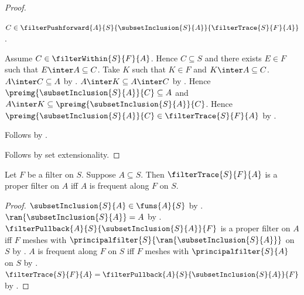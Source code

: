 \begin{proof}
\begin{subproof}
            $C\in\filterPushforward{A}{S}{\subsetInclusion{S}{A}}{
                \filterTrace{S}{F}{A}}$.
        \begin{subproof}
            Assume $C\in\filterWithin{S}{F}{A}$.
            Hence $C\subseteq S$ and there exists $E\in F$ such that
                $E\inter A\subseteq C$.
            Take $K$ such that $K\in F$ and $K\inter A\subseteq C$.
            $A\inter C\subseteq A$ by .
            $A\inter K\subseteq A\inter C$ by
                .
            Hence $\preimg{\subsetInclusion{S}{A}}{C}\subseteq A$ and
                $A\inter K\subseteq
                    \preimg{\subsetInclusion{S}{A}}{C}$.
            Hence $\preimg{\subsetInclusion{S}{A}}{C}
                \in\filterTrace{S}{F}{A}$ by \auto.
        \end{subproof}
        Follows by \auto.
    \end{subproof}
    Follows by set extensionality.
\end{proof}

\begin{theorem}\label{filter_trace_is_proper_iff_frequent}
    Let $F$ be a filter on $S$.
    Suppose $A\subseteq S$.
    Then $\filterTrace{S}{F}{A}$ is a proper filter on $A$ iff
        $A$ is frequent along $F$ on $S$.
\end{theorem}
\begin{proof}
    $\subsetInclusion{S}{A}\in\funs{A}{S}$ by
        .
    $\ran{\subsetInclusion{S}{A}}=A$ by
        .
    $\filterPullback{A}{S}{\subsetInclusion{S}{A}}{F}$ is a proper filter
        on $A$ iff
        $F$ meshes with
            $\principalfilter{S}{\ran{\subsetInclusion{S}{A}}}$ on $S$ by
        .
    $A$ is frequent along $F$ on $S$ iff
        $F$ meshes with $\principalfilter{S}{A}$ on $S$ by
        .
    $\filterTrace{S}{F}{A}
        =\filterPullback{A}{S}{\subsetInclusion{S}{A}}{F}$ by
        .
\end{proof}
